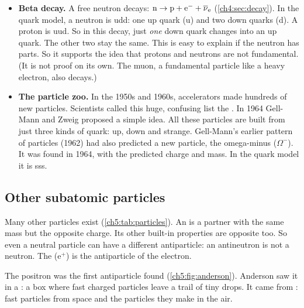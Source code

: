 \begin{itemize}
  \item \textbf{Beta decay.} A free neutron decays:
        $\mathrm{n} \to \mathrm{p} + \mathrm{e}^- + \overline{\nu}_\mathrm{e}$ (\cref{ch4:sec:decay}). In the
        quark model, a neutron is udd: one up quark (u) and two down quarks (d). A proton
        is uud. So in this decay, just \emph{one} down quark changes into an up quark. The
        other two stay the same. This is easy to explain if the neutron has parts. So it
        supports the idea that protons and neutrons are not fundamental. (It is not proof
        on its own. The muon, a fundamental particle like a heavy electron, also decays.)
  \item \textbf{The particle zoo.} In the 1950s and 1960s, accelerators made hundreds of
        new particles. Scientists called this huge, confusing list the .
        In 1964 Gell-Mann and Zweig proposed a simple idea. All these particles are built
        from just three kinds of quark: up, down and strange. Gell-Mann's earlier pattern
        of particles (1962) had also predicted a new particle, the omega-minus
        ($\Omega^-$). It was found in 1964, with the predicted charge and mass. In the
        quark model it is sss.
\end{itemize}

\subsection{Other subatomic particles}

Many other particles exist (\cref{ch5:tab:particles}). An  is a partner
with the same mass but the opposite charge. Its other built-in properties are opposite
too. So even a neutral particle can have a different antiparticle: an antineutron is not
a neutron. The  ($\mathrm{e}^+$) is the antiparticle of the electron.

The positron was the first antiparticle found (\cref{ch5:fig:anderson}). Anderson saw it
in a : a box where fast charged particles leave a trail of tiny drops.
It came from : fast particles from space and the particles they make in
the air.

